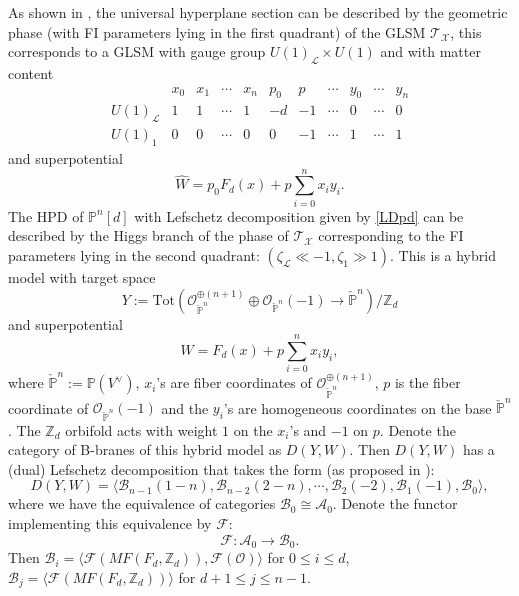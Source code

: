 \documentclass[a4paper,11pt]{article}
\def\cO{\mathcal{O}}
\def\cA{\mathcal{A}}
\newcommand{\bP}{{\mathbb{P}}}
\numberwithin{equation}{section}
\begin{document}
As shown in \cite{Chen:2020iyo}, the universal hyperplane section can be 
described by the geometric phase (with FI parameters lying in the first 
quadrant) of the GLSM $\mathcal{T}_{\mathcal{X}}$, this corresponds to a GLSM 
with gauge group $U(1)_{\mathcal{L}}\times U(1)$ and with matter content
\[
\begin{array}{ccccccccccc}
& x_0 & x_1 & \cdots & x_n & p_0 & p & \cdots & y_0 & \cdots & y_n \\
U(1)_{\mathcal{L}} & 1 & 1 & \cdots & 1 & -d & -1 & \cdots & 0 & \cdots & 0 \\
U(1)_{1} & 0 & 0 & \cdots & 0 & 0 &  -1   & \cdots & 1 & \cdots & 1
\end{array}
\]
and superpotential
\[
\widehat{W} = p_0 F_{d}(x) + p \sum_{i=0}^n x_i y_i.
\]
The HPD of $\bP^n[d]$ with Lefschetz decomposition given by \eqref{LDpd} can be 
described by the Higgs branch of the phase of 
$\mathcal{T}_{\mathcal{X}}$ corresponding to the FI parameters lying in the 
second quadrant: $(\zeta_{\mathcal{L}}\ll -1,\zeta_{1}\gg 1)$. This is 
a hybrid model with target space
\[
Y:=\mathrm{Tot}\left( \cO_{\check{\mathbb{P}}^{n}}^{\oplus(n+1)}\oplus 
\cO_{\check{\mathbb{P}}^{n}}(-1) \rightarrow \check{\bP}^n \right)/\mathbb{Z}_d 
\]
and superpotential
\begin{equation}\label{potentialCIHPD}
W = F_{d}(x) + p \sum_{i=0}^n x_i y_i,
\end{equation}
where $\check{\bP}^n:=\bP(V^{\vee})$, $x_i$'s are fiber coordinates of 
$\cO_{\check{\mathbb{P}}^{n}}^{\oplus(n+1)}$, $p$ is the fiber coordinate of 
$\cO_{\check{\mathbb{P}}^{n}}(-1)$ and the $y_i$'s are homogeneous 
coordinates on the base $\check{\bP}^n$. The $\mathbb{Z}_d$ orbifold acts with 
weight $1$ on the $x_{i}$'s and $-1$ on $p$. Denote the category of B-branes of 
this hybrid model as $D(Y,W)$.
Then $D(Y,W)$ has a (dual) Lefschetz decomposition that takes the form (as 
proposed in \cite{Chen:2020iyo}):
\begin{equation}
D(Y,W) = \langle \mathcal{B}_{n-1}(1-n), 
\mathcal{B}_{n-2}(2-n),\cdots, \mathcal{B}_2(-2), \mathcal{B}_1(-1), 
\mathcal{B}_0 \rangle,
\end{equation}
where we have the equivalence of categories 
$\mathcal{B}_{0}\cong\mathcal{A}_{0}$. Denote the functor 
implementing this equivalence by $\mathcal{F}$:
\[
\mathcal{F}: \cA_0 \rightarrow \mathcal{B}_0.
\]
Then $\mathcal{B}_i = \langle 
\mathcal{F}(MF(F_{d},\mathbb{Z}_{d})), \mathcal{F}(\mathcal{O}) \rangle$ for 
$ 0 \leq i \leq d$, $\mathcal{B}_j = \langle 
\mathcal{F}(MF(F_{d},\mathbb{Z}_{d})) \rangle$ for $ d+1 \leq j \leq n-1$.
\end{document}
